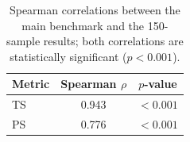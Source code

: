 \begin{table}[t]
\centering
\small
\setlength{\tabcolsep}{6pt}
\begin{tabular}{lcc}
\toprule
\textbf{Metric} & \textbf{Spearman $\rho$} & \textbf{$p$-value} \\
\midrule
TS & 0.943 & $< 0.001$ \\
PS & 0.776 & $< 0.001$ \\
\bottomrule
\end{tabular}
\caption{Spearman correlations between the main benchmark and the 150-sample results; both correlations are statistically significant ($p < 0.001$).}
\label{tab:additional_dataset_correlation}
\end{table}